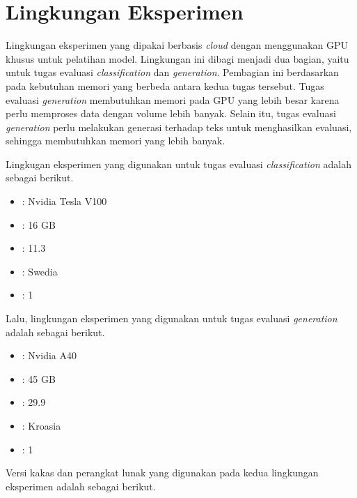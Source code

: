 \section{Lingkungan Eksperimen}
\label{sec:lingkungan-eksperimen}

Lingkungan eksperimen yang dipakai berbasis \textit{cloud} dengan menggunakan GPU khusus untuk pelatihan model. Lingkungan ini dibagi menjadi dua bagian, yaitu untuk tugas evaluasi \textit{classification} dan \textit{generation}. Pembagian ini berdasarkan pada kebutuhan memori yang berbeda antara kedua tugas tersebut. Tugas evaluasi \textit{generation} membutuhkan memori pada GPU yang lebih besar karena perlu memproses data dengan volume lebih banyak. Selain itu, tugas evaluasi \textit{generation} perlu melakukan generasi terhadap teks untuk menghasilkan evaluasi, sehingga membutuhkan memori yang lebih banyak.

Lingkugan eksperimen yang digunakan untuk tugas evaluasi \textit{classification} adalah sebagai berikut.

\begin{itemize}
    \item {} : Nvidia Tesla V100
    \item {} : 16 GB
    \item {} : 11.3
    \item {} : Swedia
    \item {} : 1
\end{itemize}

Lalu, lingkungan eksperimen yang digunakan untuk tugas evaluasi \textit{generation} adalah sebagai berikut.

\begin{itemize}
    \item {} : Nvidia A40
    \item {} : 45 GB
    \item {} : 29.9
    \item {} : Kroasia
    \item {} : 1
\end{itemize}

Versi kakas dan perangkat lunak yang digunakan pada kedua lingkungan eksperimen adalah sebagai berikut.


